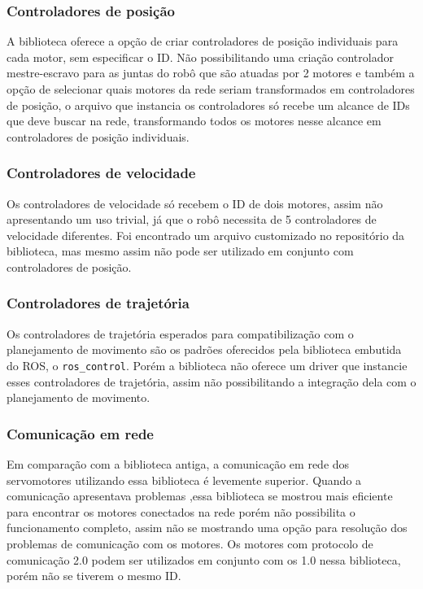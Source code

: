 \subsubsection{Controladores de posição}
A biblioteca oferece a opção de criar controladores de posição individuais para cada motor, sem especificar o ID. Não possibilitando uma criação controlador mestre-escravo para as juntas do robô que são atuadas por 2 motores e também a opção de selecionar quais motores da rede seriam transformados em controladores de posição, o arquivo que instancia os controladores só recebe um alcance de IDs que deve buscar na rede, transformando todos os motores nesse alcance em controladores de posição individuais.

\subsubsection{Controladores de velocidade}
Os controladores de velocidade só recebem o ID de dois motores, assim não apresentando um uso trivial, já que o robô necessita de 5 controladores de velocidade diferentes. Foi encontrado um arquivo customizado no repositório da biblioteca, mas mesmo assim não pode ser utilizado em conjunto com controladores de posição.
\subsubsection{Controladores de trajetória}
Os controladores de trajetória esperados para compatibilização com o planejamento de movimento são os padrões oferecidos pela biblioteca embutida do ROS, o \verb|ros_control|. Porém a biblioteca não oferece um driver que instancie esses controladores de trajetória, assim não possibilitando a integração dela com o planejamento de movimento.

\subsubsection{Comunicação em rede}
Em comparação com a biblioteca antiga, a comunicação em rede dos servomotores utilizando essa biblioteca é levemente superior. Quando a comunicação apresentava problemas ,essa biblioteca se mostrou mais eficiente para encontrar os motores conectados na rede porém não possibilita o funcionamento completo, assim não se mostrando uma opção para resolução dos problemas de comunicação com os motores.
Os motores com protocolo de comunicação 2.0 podem ser utilizados em conjunto com os 1.0 nessa biblioteca, porém não se tiverem o mesmo ID.


